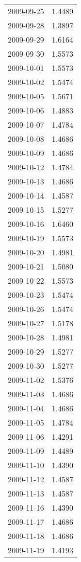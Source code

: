 \begin{tabular}{lr}
2009-09-25 &      1.4489 \\
2009-09-28 &      1.3897 \\
2009-09-29 &      1.6164 \\
2009-09-30 &      1.5573 \\
2009-10-01 &      1.5573 \\
2009-10-02 &      1.5474 \\
2009-10-05 &      1.5671 \\
2009-10-06 &      1.4883 \\
2009-10-07 &      1.4784 \\
2009-10-08 &      1.4686 \\
2009-10-09 &      1.4686 \\
2009-10-12 &      1.4784 \\
2009-10-13 &      1.4686 \\
2009-10-14 &      1.4587 \\
2009-10-15 &      1.5277 \\
2009-10-16 &      1.6460 \\
2009-10-19 &      1.5573 \\
2009-10-20 &      1.4981 \\
2009-10-21 &      1.5080 \\
2009-10-22 &      1.5573 \\
2009-10-23 &      1.5474 \\
2009-10-26 &      1.5474 \\
2009-10-27 &      1.5178 \\
2009-10-28 &      1.4981 \\
2009-10-29 &      1.5277 \\
2009-10-30 &      1.5277 \\
2009-11-02 &      1.5376 \\
2009-11-03 &      1.4686 \\
2009-11-04 &      1.4686 \\
2009-11-05 &      1.4784 \\
2009-11-06 &      1.4291 \\
2009-11-09 &      1.4489 \\
2009-11-10 &      1.4390 \\
2009-11-12 &      1.4587 \\
2009-11-13 &      1.4587 \\
2009-11-16 &      1.4390 \\
2009-11-17 &      1.4686 \\
2009-11-18 &      1.4686 \\
2009-11-19 &      1.4193 \\

\end{tabular}
